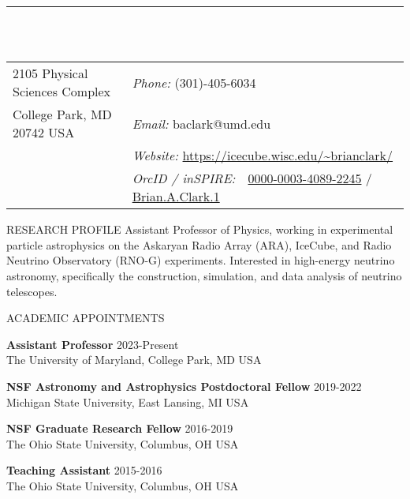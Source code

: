\documentclass{resume} %
\begin{document}

\vspace{-1cm}
\rule{\textwidth}{0.1cm} \\ \\
\begin{tabular}{@{}p{2.5in}p{4in}}
2105 Physical Sciences Complex            & {\it Phone:}  (301)-405-6034 \\            
College Park, MD 20742  USA & {\it Email:}  baclark@umd.edu
 \\         
   & {\it Website:} \url{https://icecube.wisc.edu/~brianclark/} \\       
   & {\it OrcID / inSPIRE:} \,\,      \href{https://orcid.org/0000-0003-4089-2245}{0000-0003-4089-2245}  / \href{https://inspirehep.net/author/profile/Brian.A.Clark.1}{Brian.A.Clark.1}\\     
\end{tabular}


\begin{rSection}{RESEARCH PROFILE}
Assistant Professor of Physics, working in experimental particle astrophysics on the Askaryan Radio Array (ARA), IceCube, and Radio Neutrino Observatory (RNO-G) experiments. Interested in high-energy neutrino astronomy, specifically the construction, simulation, and data analysis of neutrino telescopes.
\end{rSection}
\vspace{-0.1cm}



\begin{rSection}{ACADEMIC APPOINTMENTS}

\textbf{Assistant Professor} \hfill 2023-Present \\ The University of Maryland, College Park, MD USA 

\textbf{NSF Astronomy and Astrophysics Postdoctoral Fellow} \hfill 2019-2022 \\ Michigan State University, East Lansing, MI USA 

\textbf{NSF Graduate Research Fellow} \hfill 2016-2019 \\ The Ohio State University, Columbus, OH USA 

\textbf{Teaching Assistant} \hfill 2015-2016 \\ The Ohio State University, Columbus, OH USA 


\end{rSection}
\end{document}
